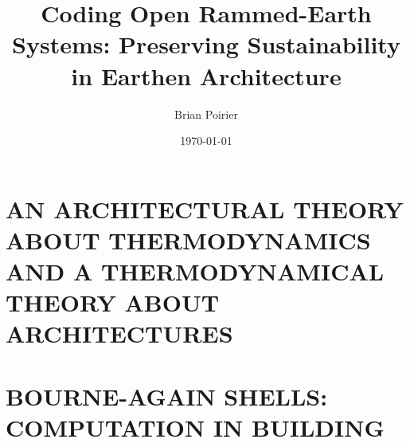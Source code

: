 \documentclass{article}
\begin{document}
\title{Coding Open Rammed-Earth Systems: Preserving Sustainability in Earthen Architecture}
\author{Brian Poirier}
\date{\today}
\maketitle
\clearpage

\tableofcontents
\clearpage



\clearpage

\section{AN ARCHITECTURAL THEORY ABOUT THERMODYNAMICS AND A THERMODYNAMICAL THEORY ABOUT ARCHITECTURES}





\section{BOURNE-AGAIN SHELLS: COMPUTATION IN BUILDING}




\printbibliography
\end{document}
